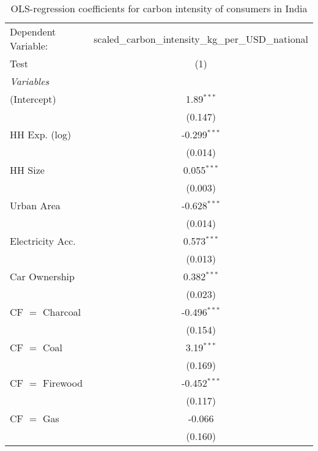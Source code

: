 
\begin{table}[htbp!]
   \centering
   \small
   \begin{adjustbox}{width = 1\textwidth, max height = 0.95\textheight, center}
      \begin{threeparttable}[b]
         \caption{\label{tab:OLS_1_IND} OLS-regression coefficients for carbon intensity of consumers in India}
         \begin{tabular}{lc}
            \tabularnewline \midrule \midrule
            Dependent Variable: & scaled\_carbon\_intensity\_kg\_per\_USD\_national\\        
            Test                & (1)\\  
            \midrule
            \emph{Variables}\\
            (Intercept)         & 1.89$^{***}$\\   
                                & (0.147)\\   
            HH Exp. (log)       & -0.299$^{***}$\\   
                                & (0.014)\\   
            HH Size             & 0.055$^{***}$\\   
                                & (0.003)\\   
            Urban Area          & -0.628$^{***}$\\   
                                & (0.014)\\   
            Electricity Acc.    & 0.573$^{***}$\\   
                                & (0.013)\\   
            Car Ownership       & 0.382$^{***}$\\   
                                & (0.023)\\   
            CF $=$ Charcoal     & -0.496$^{***}$\\   
                                & (0.154)\\   
            CF $=$ Coal         & 3.19$^{***}$\\   
                                & (0.169)\\   
            CF $=$ Firewood     & -0.452$^{***}$\\   
                                & (0.117)\\   
            CF $=$ Gas          & -0.066\\   
                                & (0.160)\\   

\end{tabular}
\end{threeparttable}
\end{adjustbox}
\end{table}
